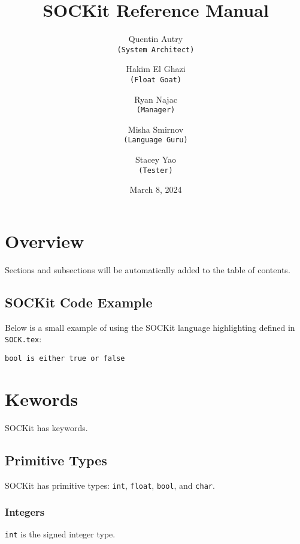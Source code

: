 \documentclass[12pt,a4paper]{article}
\title{SOCKit Reference Manual}
\author{
    Quentin Autry\\
        \texttt{(System Architect)} \and
    Hakim El Ghazi\\
        \texttt{(Float Goat)} \and
    Ryan Najac\\
        \texttt{(Manager)} \and
    Misha Smirnov\\
        \texttt{(Language Guru)} \and
    Stacey Yao\\
        \texttt{(Tester)}
}
\date{March 8, 2024}
\begin{document}
\maketitle
\newpage
\tableofcontents
\newpage

\section{Overview}
Sections and subsections will be automatically added to the table of contents.

\subsection{SOCKit Code Example}
Below is a small example of using the SOCKit language highlighting defined in \texttt{SOCK.tex}:

\begin{lstlisting}[language=SOCKit]
bool is either true or false
\end{lstlisting}

\section{Kewords}
SOCKit has keywords.

\subsection{Primitive Types}
SOCKit has primitive types: \texttt{int}, \texttt{float}, \texttt{bool}, and \texttt{char}.

\subsubsection{Integers}
\texttt{int} is the signed integer type.
\end{document}
